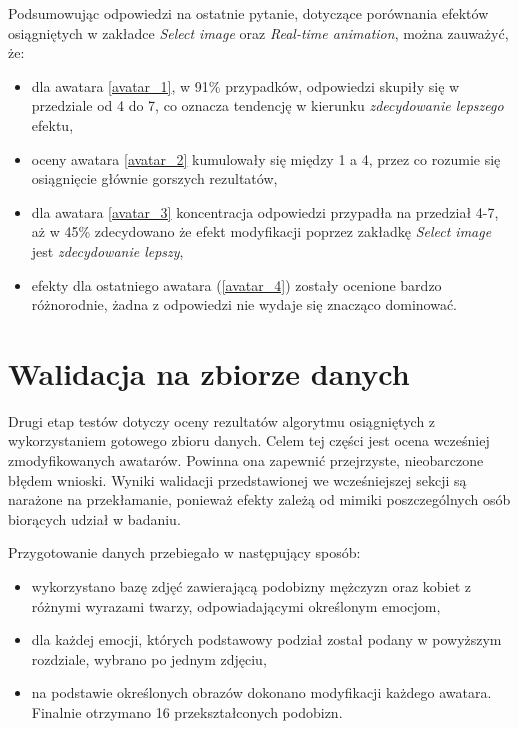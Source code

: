 \newpage
Podsumowując odpowiedzi na ostatnie pytanie, dotyczące porównania efektów osiągniętych w zakładce \textit{Select image} oraz \textit{Real-time animation}, można zauważyć, że:
\begin{itemize}
    \item dla awatara \ref{avatar_1}, w 91\% przypadków, odpowiedzi skupiły się w przedziale od 4 do 7, co oznacza tendencję w kierunku \textit{zdecydowanie lepszego} efektu,
    \item oceny awatara \ref{avatar_2} kumulowały się między 1 a 4, przez co rozumie się osiągnięcie głównie gorszych rezultatów,
    \item dla awatara \ref{avatar_3} koncentracja odpowiedzi przypadła na przedział 4-7, aż w 45\% zdecydowano że efekt modyfikacji poprzez zakładkę \textit{Select image} jest \textit{zdecydowanie lepszy},
    \item efekty dla ostatniego awatara (\ref{avatar_4}) zostały ocenione bardzo różnorodnie, żadna z odpowiedzi nie wydaje się znacząco dominować.
\end{itemize}



\section{Walidacja na zbiorze danych}
Drugi etap testów dotyczy oceny rezultatów algorytmu osiągniętych z wykorzystaniem gotowego zbioru danych. Celem tej części jest ocena wcześniej zmodyfikowanych awatarów. Powinna ona zapewnić przejrzyste, nieobarczone błędem wnioski. Wyniki walidacji przedstawionej we wcześniejszej sekcji są narażone na przekłamanie, ponieważ efekty zależą od mimiki poszczególnych osób biorących udział w badaniu.

Przygotowanie danych przebiegało w następujący sposób:
\begin{itemize}
    \item wykorzystano bazę zdjęć zawierającą podobizny mężczyzn oraz kobiet z różnymi wyrazami twarzy, odpowiadającymi określonym emocjom,
    \item dla każdej emocji, których podstawowy podział został podany w powyższym rozdziale, wybrano po jednym zdjęciu,
    \item na podstawie określonych obrazów dokonano modyfikacji każdego awatara. Finalnie otrzymano 16 przekształconych podobizn.
\end{itemize}

